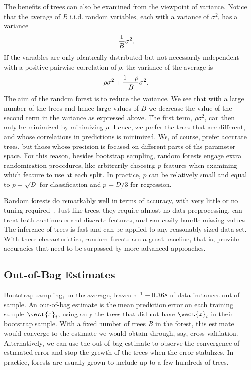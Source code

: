 \begin{refsection}
The benefits of trees can also be examined from the viewpoint of variance. Notice that the average of $B$ i.i.d. random variables, each with a variance of $\sigma^2$, has a variance
$${1\over B}\sigma^2.$$
If the variables are only identically distributed but not necessarily independent with a positive pairwise correlation of $\rho$, the variance of the average is
$$\rho\sigma^2+{1-\rho\over B}\sigma^2.$$
The aim of the random forest is to reduce the variance. We see that with a large number of the trees and hence large values of $B$ we decrease the value of the second term in the variance as expressed above. The first term, $\rho\sigma^2$, can then only be minimized by minimizing $\rho$. Hence, we prefer the trees that are different, and whose correlations in predictions is minimized. We, of course, prefer accurate trees, but those whose precision is focused on different parts of the parameter space. For this reason, besides bootstrap sampling, random forests engage extra randomization procedures, like arbitrarily choosing $p$ features when examining which feature to use at each split. In practice, $p$ can be relatively small and equal to $p=\sqrt{D}$ for classification and $p=D/3$ for regression.

Random forests do remarkably well in terms of accuracy, with very little or no tuning required~\citep{Fernandez-Delgado2014}. Just like trees, they require almost no data preprocessing, can treat both continuous and discrete features, and can easily handle missing values. The inference of trees is fast and can be applied to any reasonably sized data set. With these characteristics, random forests are a great baseline, that is, provide accuracies that need to be surpassed by more advanced approaches.

\subsection*{Out-of-Bag Estimates}

Bootstrap sampling, on the average, leaves $e^{-1}=0.368$ of data instances out of sample. An out-of-bag estimate is the mean prediction error on each training sample $\vect{x}_i$, using only the trees that did not have $\vect{x}_i$ in their bootstrap sample. With a fixed number of trees $B$ in the forest, this estimate would converge to the estimate we would obtain through, say, cross-validation. Alternatively, we can use the out-of-bag estimate to observe the convergence of estimated error and stop the growth of the trees when the error stabilizes. In practice, forests are usually grown to include up to a few hundreds of trees.


\end{refsection}
